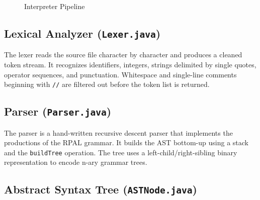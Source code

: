 \documentclass[12pt,a4paper]{article}
\begin{document}
\begin{figure}[H]
\centering
{}
\caption{Interpreter Pipeline}
\label{fig:interpreter-pipeline}
\end{figure}

\subsection{Lexical Analyzer (\texttt{Lexer.java})}

The lexer reads the source file character by character and produces a cleaned token stream. It recognizes identifiers, integers, strings delimited by single quotes, operator sequences, and punctuation. Whitespace and single-line comments beginning with \texttt{//} are filtered out before the token list is returned.

\subsection{Parser (\texttt{Parser.java})}

The parser is a hand-written recursive descent parser that implements the productions of the RPAL grammar. It builds the AST bottom-up using a stack and the \texttt{buildTree} operation. The tree uses a left-child/right-sibling binary representation to encode n-ary grammar trees.

\subsection{Abstract Syntax Tree (\texttt{ASTNode.java})}
\end{document}
